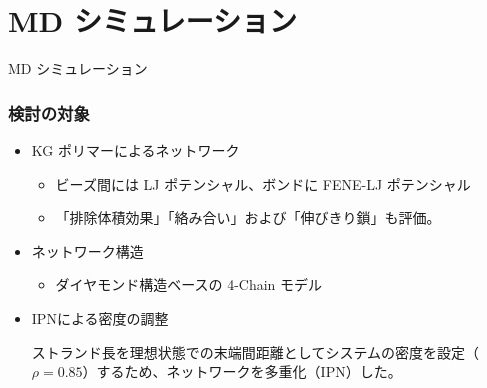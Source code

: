 \documentclass[11pt, dvipdfmx]{beamer}
\begin{document}
\section{MD シミュレーション}
\begin{frame}
\LARGE{MD シミュレーション}
\end{frame}

\begin{frame}
\frametitle{検討の対象}

\begin{block}{}
	\begin{itemize}
	\item KG ポリマーによるネットワーク
		\begin{itemize}
		\item ビーズ間には LJ ポテンシャル、ボンドに FENE-LJ ポテンシャル
		\item 「排除体積効果」「絡み合い」および「伸びきり鎖」も評価。
		\end{itemize}
	\item ネットワーク構造
		\begin{itemize}
		\item ダイヤモンド構造ベースの 4-Chain モデル
		\end{itemize}
	\item IPNによる密度の調整

	ストランド長を理想状態での末端間距離としてシステムの密度を設定（$\rho = 0.85$）するため、ネットワークを多重化（IPN）した。
	\end{itemize}
\end{block}


\end{frame}
\end{document}
